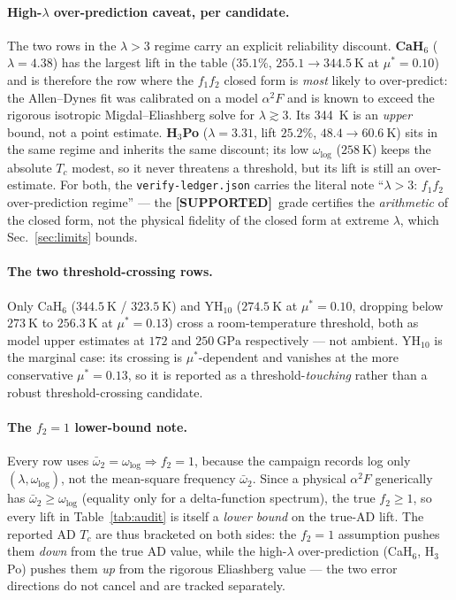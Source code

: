 \documentclass[11pt,a4paper]{article}
\providecommand{\tierGreen}{\textcolor{green!50!black}{\textbf{[SUPPORTED]}}}
\begin{document}
\paragraph{High-$\lambda$ over-prediction caveat, per candidate.}
The two rows in the $\lambda > 3$ regime carry an explicit reliability discount.
\textbf{CaH$_6$} ($\lambda{=}4.38$) has the largest lift in the table ($35.1\%$,
$255.1\!\to\!\SI{344.5}{\kelvin}$ at $\mu^*{=}0.10$) and is therefore the row
where the $f_1 f_2$ closed form is \emph{most} likely to over-predict: the
Allen--Dynes fit was calibrated on a model $\alpha^2F$ and is known to exceed the
rigorous isotropic Migdal--Eliashberg solve for $\lambda \gtrsim 3$. Its
\SI{344}{\kelvin} is an \emph{upper} bound, not a point estimate.
\textbf{H$_3$Po} ($\lambda{=}3.31$, lift $25.2\%$,
$48.4\!\to\!\SI{60.6}{\kelvin}$) sits in the same regime and inherits the same
discount; its low $\omega_{\log}$ ($\SI{258}{\kelvin}$) keeps the absolute $T_c$
modest, so it never threatens a threshold, but its lift is still an over-estimate.
For both, the \texttt{verify-ledger.json} carries the literal note
``$\lambda{>}3$: $f_1 f_2$ over-prediction regime'' --- the \tierGreen\ grade
certifies the \emph{arithmetic} of the closed form, not the physical fidelity of
the closed form at extreme $\lambda$, which Sec.~\ref{sec:limits} bounds.

\paragraph{The two threshold-crossing rows.}
Only CaH$_6$ ($\SI{344.5}{\kelvin}$ / $\SI{323.5}{\kelvin}$) and YH$_{10}$
($\SI{274.5}{\kelvin}$ at $\mu^*{=}0.10$, dropping below $\SI{273}{\kelvin}$ to
$\SI{256.3}{\kelvin}$ at $\mu^*{=}0.13$) cross a room-temperature threshold, both
as model upper estimates at $172$ and $\SI{250}{\giga\pascal}$ respectively ---
not ambient. YH$_{10}$ is the marginal case: its crossing is $\mu^*$-dependent and
vanishes at the more conservative $\mu^*{=}0.13$, so it is reported as a
threshold-\emph{touching} rather than a robust threshold-crossing candidate.

\paragraph{The $f_2{=}1$ lower-bound note.}
Every row uses $\bar\omega_2=\omega_{\log}\Rightarrow f_2=1$, because the campaign
records log only $(\lambda,\omega_{\log})$, not the mean-square frequency
$\bar\omega_2$. Since a physical $\alpha^2F$ generically has
$\bar\omega_2 \ge \omega_{\log}$ (equality only for a delta-function spectrum),
the true $f_2 \ge 1$, so every lift in Table~\ref{tab:audit} is itself a
\emph{lower bound} on the true-AD lift. The reported AD $T_c$ are thus bracketed
on both sides: the $f_2{=}1$ assumption pushes them \emph{down} from the true AD
value, while the high-$\lambda$ over-prediction (CaH$_6$, H$_3$Po) pushes them
\emph{up} from the rigorous Eliashberg value --- the two error directions do not
cancel and are tracked separately.
\end{document}
